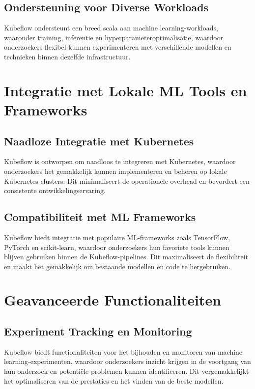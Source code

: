 \subsection{Ondersteuning voor Diverse Workloads}
Kubeflow ondersteunt een breed scala aan machine learning-workloads, waaronder training, inferentie en hyperparameteroptimalisatie, waardoor onderzoekers flexibel kunnen experimenteren met verschillende modellen en technieken binnen dezelfde infrastructuur.

\section{Integratie met Lokale ML Tools en Frameworks}

\subsection{Naadloze Integratie met Kubernetes}
Kubeflow is ontworpen om naadloos te integreren met Kubernetes, waardoor onderzoekers het gemakkelijk kunnen implementeren en beheren op lokale Kubernetes-clusters. Dit minimaliseert de operationele overhead en bevordert een consistente ontwikkelingservaring.

\subsection{Compatibiliteit met ML Frameworks}
Kubeflow biedt integratie met populaire ML-frameworks zoals TensorFlow, PyTorch en scikit-learn, waardoor onderzoekers hun favoriete tools kunnen blijven gebruiken binnen de Kubeflow-pipelines. Dit maximaliseert de flexibiliteit en maakt het gemakkelijk om bestaande modellen en code te hergebruiken.

\section{Geavanceerde Functionaliteiten}

\subsection{Experiment Tracking en Monitoring}
Kubeflow biedt functionaliteiten voor het bijhouden en monitoren van machine learning-experimenten, waardoor onderzoekers inzicht krijgen in de voortgang van hun onderzoek en potentiële problemen kunnen identificeren. Dit vergemakkelijkt het optimaliseren van de prestaties en het vinden van de beste modellen.


